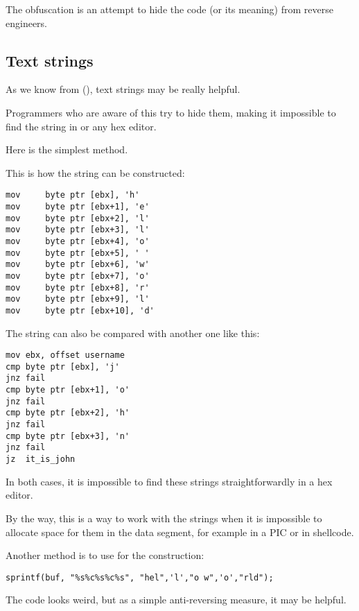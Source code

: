 
The obfuscation is an attempt to hide the code (or its meaning) from reverse engineers.

\subsection{Text strings}

As we know from (), text strings may be really helpful.

Programmers who are aware of this try to hide them, making it impossible to find the string in \IDA{} or any hex editor.

Here is the simplest method.

This is how the string can be constructed:

\begin{lstlisting}[style=customasmx86]
mov     byte ptr [ebx], 'h'
mov     byte ptr [ebx+1], 'e'
mov     byte ptr [ebx+2], 'l'
mov     byte ptr [ebx+3], 'l'
mov     byte ptr [ebx+4], 'o'
mov     byte ptr [ebx+5], ' '
mov     byte ptr [ebx+6], 'w'
mov     byte ptr [ebx+7], 'o'
mov     byte ptr [ebx+8], 'r'
mov     byte ptr [ebx+9], 'l'
mov     byte ptr [ebx+10], 'd'
\end{lstlisting}

The string can also be compared with another one like this:

\begin{lstlisting}[style=customasmx86]
mov	ebx, offset username
cmp	byte ptr [ebx], 'j'
jnz	fail
cmp	byte ptr [ebx+1], 'o'
jnz	fail
cmp	byte ptr [ebx+2], 'h'
jnz	fail
cmp	byte ptr [ebx+3], 'n'
jnz	fail
jz	it_is_john
\end{lstlisting}

In both cases, it is impossible to find these strings straightforwardly in a hex editor.


By the way, this is a way to work with the strings when it is impossible
to allocate space for them in the data segment, for example in a \ac{PIC} or in shellcode.

Another method is to use  
for the construction:

\begin{lstlisting}[style=customc]
sprintf(buf, "%s%c%s%c%s", "hel",'l',"o w",'o',"rld");
\end{lstlisting}

The code looks weird, but as a simple anti-reversing measure, it may be helpful.

